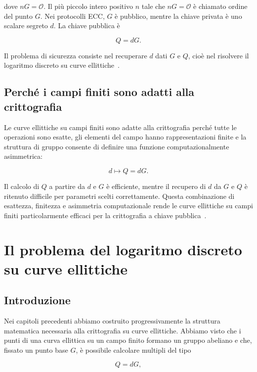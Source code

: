 \documentclass[12pt,a4paper,oneside]{report}
\begin{document}
dove \(nG=\mathcal{O}\). Il più piccolo intero positivo \(n\) tale che \(nG=\mathcal{O}\) è chiamato ordine del punto \(G\). Nei protocolli ECC, \(G\) è pubblico, mentre la chiave privata è uno scalare segreto \(d\). La chiave pubblica è

\[
Q=dG.
\]

Il problema di sicurezza consiste nel recuperare \(d\) dati \(G\) e \(Q\), cioè nel risolvere il logaritmo discreto su curve ellittiche~\cite{margara_ec,sec1}.

\section{Perché i campi finiti sono adatti alla crittografia}

Le curve ellittiche su campi finiti sono adatte alla crittografia perché tutte le operazioni sono esatte, gli elementi del campo hanno rappresentazioni finite e la struttura di gruppo consente di definire una funzione computazionalmente asimmetrica:

\[
d\longmapsto Q=dG.
\]

Il calcolo di \(Q\) a partire da \(d\) e \(G\) è efficiente, mentre il recupero di \(d\) da \(G\) e \(Q\) è ritenuto difficile per parametri scelti correttamente. Questa combinazione di esattezza, finitezza e asimmetria computazionale rende le curve ellittiche su campi finiti particolarmente efficaci per la crittografia a chiave pubblica~\cite{margara_ec,sec1}.

\chapter{Il problema del logaritmo discreto su curve ellittiche}

\section{Introduzione}

Nei capitoli precedenti abbiamo costruito progressivamente la struttura matematica necessaria alla crittografia su curve ellittiche. Abbiamo visto che i punti di una curva ellittica su un campo finito formano un gruppo abeliano e che, fissato un punto base \(G\), è possibile calcolare multipli del tipo~\cite{margara_ec,sec1}

\[
Q = dG,
\]
\end{document}
